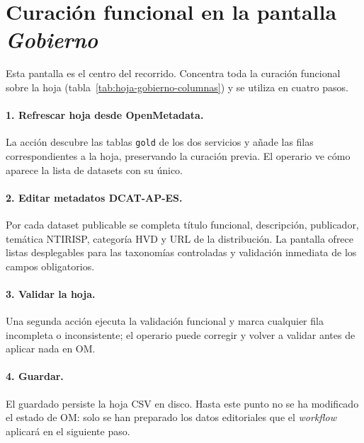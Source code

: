 
\section{Curación funcional en la pantalla \emph{Gobierno}}\label{sec:demo-gobierno}

Esta pantalla es el centro del recorrido. Concentra toda la curación funcional sobre la hoja  (tabla~\ref{tab:hoja-gobierno-columnas}) y se utiliza en cuatro pasos.

\paragraph{1. Refrescar hoja desde OpenMetadata.} La acción descubre las tablas \texttt{gold} de los dos servicios y añade las filas correspondientes a la hoja, preservando la curación previa. El operario ve cómo aparece la lista de datasets con su  único.

\paragraph{2. Editar metadatos DCAT-AP-ES.} Por cada dataset publicable se completa título funcional, descripción, publicador, temática \ac{NTIRISP}, categoría \ac{HVD} y \ac{URL} de la distribución. La pantalla ofrece listas desplegables para las taxonomías controladas y validación inmediata de los campos obligatorios.

\paragraph{3. Validar la hoja.} Una segunda acción ejecuta la validación funcional y marca cualquier fila incompleta o inconsistente; el operario puede corregir y volver a validar antes de aplicar nada en \ac{OM}.

\paragraph{4. Guardar.} El guardado persiste la hoja \ac{CSV} en disco. Hasta este punto no se ha modificado el estado de \ac{OM}: solo se han preparado los datos editoriales que el \emph{workflow} aplicará en el siguiente paso.


